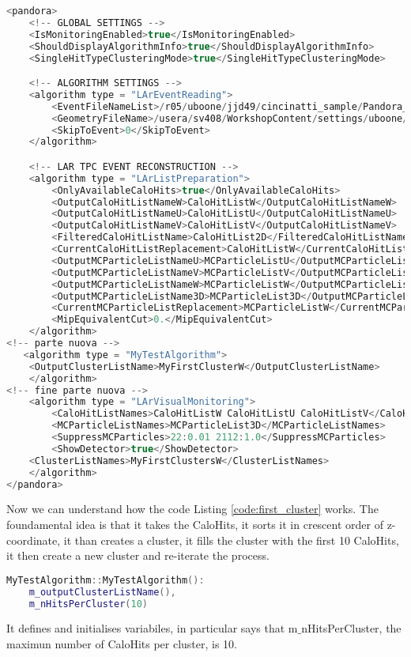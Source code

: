 \begin{lstlisting}[language=C++, label=code:first_cluster.xml, caption=PandoraSettings${\_}$Workshop.xml]
<pandora>
    <!-- GLOBAL SETTINGS -->
    <IsMonitoringEnabled>true</IsMonitoringEnabled>
    <ShouldDisplayAlgorithmInfo>true</ShouldDisplayAlgorithmInfo>
    <SingleHitTypeClusteringMode>true</SingleHitTypeClusteringMode>

    <!-- ALGORITHM SETTINGS -->
    <algorithm type = "LArEventReading">
        <EventFileNameList>/r05/uboone/jjd49/cincinatti_sample/Pandora_Events_Cincinatti_BNB_NuMu_1714.pndr</EventFileNameList>
        <GeometryFileName>/usera/sv408/WorkshopContent/settings/uboone/Geometry_MicroBooNE.xml</GeometryFileName>
        <SkipToEvent>0</SkipToEvent>
    </algorithm>

    <!-- LAR TPC EVENT RECONSTRUCTION -->
    <algorithm type = "LArListPreparation">
        <OnlyAvailableCaloHits>true</OnlyAvailableCaloHits>
        <OutputCaloHitListNameW>CaloHitListW</OutputCaloHitListNameW>
        <OutputCaloHitListNameU>CaloHitListU</OutputCaloHitListNameU>
        <OutputCaloHitListNameV>CaloHitListV</OutputCaloHitListNameV>
        <FilteredCaloHitListName>CaloHitList2D</FilteredCaloHitListName>
        <CurrentCaloHitListReplacement>CaloHitListW</CurrentCaloHitListReplacement>
        <OutputMCParticleListNameU>MCParticleListU</OutputMCParticleListNameU>
        <OutputMCParticleListNameV>MCParticleListV</OutputMCParticleListNameV>
        <OutputMCParticleListNameW>MCParticleListW</OutputMCParticleListNameW>
        <OutputMCParticleListName3D>MCParticleList3D</OutputMCParticleListName3D>
        <CurrentMCParticleListReplacement>MCParticleListW</CurrentMCParticleListReplacement>
        <MipEquivalentCut>0.</MipEquivalentCut>
    </algorithm>
<!-- parte nuova -->
   <algorithm type = "MyTestAlgorithm">
	<OutputClusterListName>MyFirstClusterW</OutputClusterListName>
    </algorithm>
<!-- fine parte nuova -->
    <algorithm type = "LArVisualMonitoring">
        <CaloHitListNames>CaloHitListW CaloHitListU CaloHitListV</CaloHitListNames>
        <MCParticleListNames>MCParticleList3D</MCParticleListNames>
        <SuppressMCParticles>22:0.01 2112:1.0</SuppressMCParticles>
        <ShowDetector>true</ShowDetector>
	<ClusterListNames>MyFirstClustersW</ClusterListNames>
    </algorithm>
</pandora>
\end{lstlisting}

Now we can understand how the code Listing \ref{code:first_cluster} works. The foundamental idea is that it takes the CaloHits, it sorts it in crescent order of z-coordinate, it than creates a cluster, it fills the cluster with the first 10 CaloHits, it then create a new cluster and re-iterate the process. 
\begin{lstlisting}[language=C++]
MyTestAlgorithm::MyTestAlgorithm():
	m_outputClusterListName(),
	m_nHitsPerCluster(10)
\end{lstlisting}
It defines and initialises variabiles, in particular says that m${\_}$nHitsPerCluster, the maximun number of CaloHits per cluster, is 10. 

